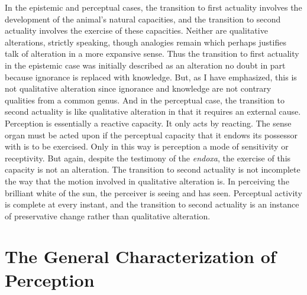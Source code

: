 In the epistemic and perceptual cases, the transition to first actuality involves the development of the animal's natural capacities, and the transition to second actuality involves the exercise of these capacities. Neither are qualitative alterations, strictly speaking, though analogies remain which perhaps justifies talk of alteration in a more expansive sense. Thus the transition to first actuality in the epistemic case was initially described as an alteration no doubt in part because ignorance is replaced with knowledge. But, as I have emphasized, this is not qualitative alteration since ignorance and knowledge are not contrary qualities from a common genus. And in the perceptual case, the transition to second actuality is like qualitative alteration in that it requires an external cause. Perception is essentially a reactive capacity. It only acts by reacting. The sense organ must be acted upon if the perceptual capacity that it endows its possessor with is to be exercised. Only in this way is perception a mode of sensitivity or receptivity. But again, despite the testimony of the \emph{endoxa}, the exercise of this capacity is not an alteration. The transition to second actuality is not incomplete the way that the motion involved in qualitative alteration is. In perceiving the brilliant white of the sun, the perceiver is seeing and has seen. Perceptual activity is complete at every instant, and the transition to second actuality is an instance of preservative change rather than qualitative alteration.


\section{The General Characterization of Perception} %
\label{sec:the_general_characterization_of_perception}

